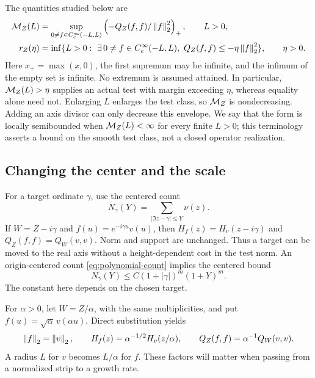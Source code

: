 The quantities studied below are
\begin{equation}\label{eq:envelope-radius}
 \begin{split}
 \mathcal M_Z(L)&=\sup_{0\ne f\in C_c^\infty(-L,L)}
       \left(-Q_Z(f,f)/\left\|f\right\|_2^2\right)_+,\qquad L>0,\\
 r_Z(\eta)&=\inf\{L>0:\ \exists\,0\ne f\in C_c^\infty(-L,L),
                 \ Q_Z(f,f)\le-\eta\left\|f\right\|_2^2\},\qquad\eta>0.
 \end{split}
\end{equation}
Here \(x_+=\max(x,0)\), the first supremum may be infinite,
and the infimum of the empty set is infinite. No extremum is assumed
attained. In particular, \(\mathcal M_Z(L)>\eta\) supplies an actual
test with margin exceeding \(\eta\), whereas equality alone need
not. Enlarging \(L\) enlarges the test class, so \(\mathcal M_Z\)
is nondecreasing. Adding an axis divisor can only decrease this
envelope. We say that the form is locally semibounded when
\(\mathcal M_Z(L)<\infty\) for every finite \(L>0\); this terminology
asserts a bound on the smooth test class, not a closed operator
realization.

\subsection{Changing the center and the scale}
For a target ordinate \(\gamma\), use the centered count
\[
 N_\gamma(Y)=\sum_{|\Im z-\gamma|\le Y}\nu(z).
\]
If \(W=Z-i\gamma\) and \(f(u)=e^{-i\gamma u}v(u)\), then
\(H_f(z)=H_v(z-i\gamma)\) and
\(Q_Z(f,f)=Q_W(v,v)\). Norm and support are unchanged.
Thus a target can be moved to the real axis without a
height-dependent cost in the test norm. An origin-centered count
\eqref{eq:polynomial-count} implies the centered bound
\[
 N_\gamma(Y)\le C(1+|\gamma|)^m(1+Y)^m.
\]
The constant here depends on the chosen target.

For \(\alpha>0\), let \(W=Z/\alpha\), with the same
multiplicities, and put \(f(u)=\sqrt\alpha\,v(\alpha u)\).
Direct substitution yields
\begin{equation}\label{eq:scale}
 \left\|f\right\|_2=\left\|v\right\|_2,\qquad
 H_f(z)=\alpha^{-1/2}H_v(z/\alpha),\qquad
 Q_Z(f,f)=\alpha^{-1}Q_W(v,v).
\end{equation}
A radius \(L\) for \(v\) becomes \(L/\alpha\) for \(f\).
These factors will matter when passing from a normalized strip to
a growth rate.


